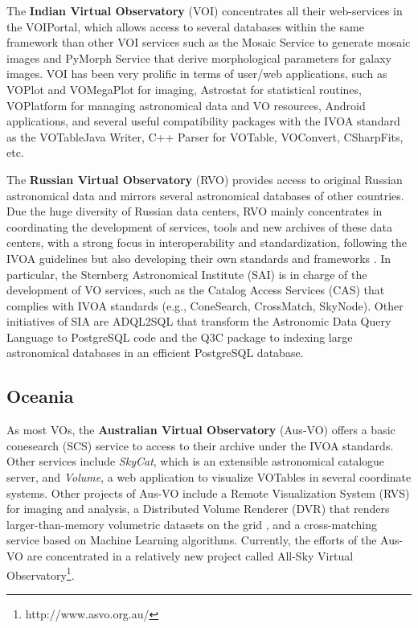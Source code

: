 The \textbf{Indian Virtual Observatory} (VOI)
concentrates all their web-services in the VOIPortal, which allows
access to several databases within the same framework than other
VOI services such as the Mosaic Service to generate mosaic images 
and PyMorph Service that derive morphological parameters for galaxy
images. VOI has been very prolific in terms of user/web applications, 
such as VOPlot and 
VOMegaPlot for imaging, Astrostat for statistical routines, VOPlatform for
managing astronomical data and VO resources, Android applications, and 
several useful compatibility packages with the IVOA standard as 
the VOTableJava Writer, C++ Parser for VOTable, VOConvert, CSharpFits, etc.

The \textbf{Russian Virtual Observatory} (RVO) provides access to original
Russian astronomical data and mirrors several astronomical databases 
of other countries. Due the huge diversity of Russian data centers,
RVO mainly concentrates in coordinating the development of services,
tools and new archives of these data centers, with a strong focus in
interoperability and standardization, following the IVOA guidelines
but also developing their own standards and frameworks \cite{Briukhov2005}.
In particular, the Sternberg Astronomical Institute (SAI) is
in charge of the development of VO services, such as the Catalog
Access Services (CAS) that complies with IVOA standards (e.g., ConeSearch,
CrossMatch, SkyNode). Other initiatives of SIA are ADQL2SQL that transform
the Astronomic Data Query Language to PostgreSQL code and the Q3C package
to indexing large astronomical databases in an efficient PostgreSQL 
database.

\subsection{Oceania}
As most VOs, the \textbf{Australian Virtual Observatory} (Aus-VO) offers a 
basic conesearch (SCS) service to access to their archive under the
IVOA standards. Other
services include \emph{SkyCat}, which is an extensible 
astronomical catalogue server, 
and \emph{Volume}, a web application to visualize VOTables in several 
coordinate systems.
Other projects of Aus-VO include a Remote Visualization
System (RVS) for imaging and analysis, a 	
Distributed Volume Renderer (DVR) that renders larger-than-memory volumetric 
datasets on the grid \cite{Beeson2003},
and a cross-matching service based on Machine Learning algorithms.
Currently, the efforts of the Aus-VO are concentrated in a relatively
new project called All-Sky Virtual 
Observatory\footnote{http://www.asvo.org.au/}.

